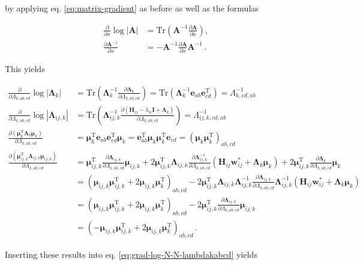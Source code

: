 \documentclass[12pt,a4paper,twoside]{book}
\renewcommand{\H}{\mathbf{H}}
\newcommand{\Hij}{\H_{ij}}
\newcommand{\I}{\mathbf{I}}
\newcommand{\Lijk}{\mathbf{\Lambda}_{ij,k}}
\newcommand{\Lk}{\mathbf{\Lambda}_k}
\newcommand{\muijk}{\mathbf{\mu}_{ij,k}}
\newcommand{\muk}{\mathbf{\mu}_k}
\newcommand{\wij}{\mathbf{w}_{ij}}
\theoremstyle{definition}
\theoremstyle{definition}
\theoremstyle{remark}
\begin{document}
by applying eq. \eqref{eq:matrix-gradient} as before as well as the
formulas

\begin{align}
    \frac{\partial}{\partial x} \log |\mathbf{A} | &= \text{Tr}\left( \mathbf{A}^{-1} \frac{\partial \mathbf{A}}{\partial x}  \right) , \\
    \frac{\partial \mathbf{A}^{-1}}{\partial x} &= - \mathbf{A}^{-1} \frac{\partial \mathbf{A}}{\partial x} \mathbf{A}^{-1} \,.
\end{align}

This yields

\begin{align}
\frac{\partial}{\partial \Lambda_{k,ab,cd}}  \log |\Lk|
     &= \text{Tr} \left( \Lk^{-1} \frac{\partial \Lk}{\partial \Lambda_{k,ab,cd}} \right) 
     = \text{Tr} \left( \Lk^{-1} \mathbf{e}_{ab} \mathbf{e}_{cd}^\mathrm{T} \right) 
     = \Lambda^{-1}_{k,cd,ab} \\
\frac{\partial}{\partial \Lambda_{k,ab,cd}}  \log |\Lijk|
     &= \text{Tr} \left( \Lijk^{-1} \frac{\partial (\H_{ij} - \lambda_w \I + \Lk)}{\partial \Lambda_{k,ab,cd}}   \right) 
     = \Lambda^{-1}_{ij,k,cd,ab} \\
\frac{\partial (\muk^\mathrm{T} \Lk \muk)}{\partial \Lambda_{k,ab,cd}} 
    &= \muk^\mathrm{T} \mathbf{e}_{ab} \mathbf{e}_{cd}^\mathrm{T} \muk 
    = \mathbf{e}_{ab}^\mathrm{T} \muk \muk^\mathrm{T} \mathbf{e}_{cd} = (\muk \muk^\mathrm{T})_{ab,cd} \\
\frac{\partial ( \muijk^\mathrm{T} \Lijk \muijk) }{\partial \Lambda_{k,ab,cd}} 
    &= \muijk^\mathrm{T} \frac{\partial \Lijk}{\partial \Lambda_{k,ab,cd}} \muijk 
    + 2 \muijk^\mathrm{T} \Lijk \frac{\partial \Lijk^{-1}}{\partial \Lambda_{k,ab,cd}}  (\Hij \wij^* + \Lk \muk) 
    + 2 \muijk^\mathrm{T} \frac{\partial \Lk}{\partial \Lambda_{k,ab,cd}} \muk \nonumber \\
    &= (\muijk \muijk^\mathrm{T} + 2 \muijk \muk^\mathrm{T})_{ab,cd} 
    - 2 \muijk^\mathrm{T} \Lijk  \Lijk^{-1} \frac{\partial \Lijk}{\partial \Lambda_{k,ab,cd}} \Lijk^{-1} (\Hij\wij^* + \Lk \muk) \\
    &= (\muijk \muijk^\mathrm{T} + 2 \muijk \muk^\mathrm{T})_{ab,cd} 
    - 2 \muijk^\mathrm{T}  \frac{\partial \Lijk}{\partial \Lambda_{k,ab,cd}} \muijk\\
    &= (- \muijk \muijk^\mathrm{T} + 2 \muijk \muk^\mathrm{T})_{ab,cd} \,.
\end{align}

Inserting these results into eq. \eqref{eq:grad-log-N-N-lambdakabcd}
yields
\end{document}
